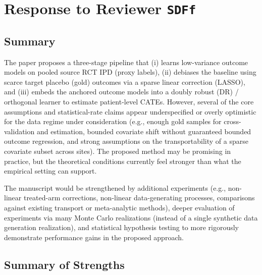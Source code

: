 \section{Response to Reviewer \texttt{SDFf}}

\subsection*{Summary}

The paper proposes a three-stage pipeline that (i) learns low-variance outcome models on pooled source RCT IPD (proxy labels), (ii) debiases the baseline using scarce target placebo (gold) outcomes via a sparse linear correction (LASSO), and (iii) embeds the anchored outcome models into a doubly robust (DR) / orthogonal learner to estimate patient-level CATEs. However, several of the core assumptions and statistical-rate claims appear underspecified or overly optimistic for the data regime under consideration (e.g., enough gold samples for cross-validation and estimation, bounded covariate shift without guaranteed bounded outcome regression, and strong assumptions on the transportability of a sparse covariate subset across sites). The proposed method may be promising in practice, but the theoretical conditions currently feel stronger than what the empirical setting can support.

The manuscript would be strengthened by additional experiments (e.g., non-linear treated-arm corrections, non-linear data-generating processes, comparisons against existing transport or meta-analytic methods), deeper evaluation of experiments via many Monte Carlo realizations (instead of a single synthetic data generation realization), and statistical hypothesis testing to more rigorously demonstrate performance gains in the proposed approach.


\subsection*{Summary of Strengths}

